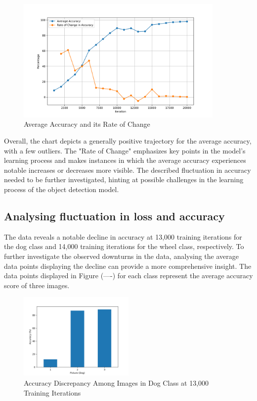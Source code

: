 \begin{figure}[h]
   \centering
   \includegraphics[width=0.9\textwidth]{../Data/accuracy-improvement-graph.png}
   \caption{Average Accuracy and its Rate of Change}
   \label{fig:accuracy-improvement}
\end{figure}

Overall, the chart depicts a generally positive trajectory for the average accuracy, with a few outliers. The "Rate of Change" emphasizes
key points in the model's learning process and makes instances in which the average accuracy experiences notable increases or decreases more
visible. The described fluctuation in accuracy needed to be further investigated, hinting at possible
challenges in the learning process of the object detection model. \\

\subsection{Analysing fluctuation in loss and accuracy}

The data reveals a notable decline in accuracy at 13,000 training iterations for the dog class and 14,000 training iterations for the wheel class, respectively. To further investigate the observed downturns in the data, analysing the average data points displaying the decline can provide a more comprehensive insight. The data points displayed in Figure (----) for each class represent the average accuracy score of three images. 
\newpage
\begin{figure}[h]
   \centering
   \includegraphics[width=0.5\textwidth]{../Data/dog-outliers.png}
   \caption{Accuracy Discrepancy Among Images in Dog Class at 13,000 Training Iterations}
   \label{fig:14000-dog}
\end{figure}


